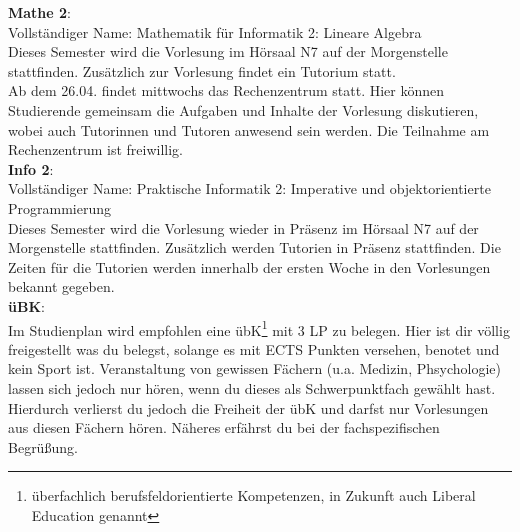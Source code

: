 \textbf{Mathe 2}:\\
Vollständiger Name: Mathematik für Informatik 2: Lineare Algebra\\
Dieses Semester wird die Vorlesung im Hörsaal N7 auf der Morgenstelle stattfinden.
Zusätzlich zur Vorlesung findet ein Tutorium statt. \\
Ab dem 26.04. findet mittwochs das Rechenzentrum statt. Hier können Studierende gemeinsam die Aufgaben und Inhalte der Vorlesung diskutieren,
wobei auch Tutorinnen und Tutoren anwesend sein werden. Die Teilnahme am Rechenzentrum ist freiwillig.\\

\textbf{Info 2}:\\
Vollständiger Name: Praktische Informatik 2: Imperative und objektorientierte Programmierung\\
Dieses Semester wird die Vorlesung wieder in Präsenz im Hörsaal N7 auf der Morgenstelle stattfinden.
Zusätzlich werden Tutorien in Präsenz stattfinden.
Die Zeiten für die Tutorien werden innerhalb der ersten Woche in den Vorlesungen bekannt gegeben.\\

\textbf{üBK}:\\
Im Studienplan wird empfohlen eine übK\footnote{überfachlich berufsfeldorientierte Kompetenzen, in Zukunft auch Liberal Education genannt}
mit 3 LP zu belegen. Hier ist dir völlig freigestellt was du belegst, solange es mit ECTS Punkten versehen, benotet und kein Sport ist.
Veranstaltung von gewissen Fächern (u.a. Medizin, Phsychologie) lassen sich jedoch nur hören, wenn du dieses als Schwerpunktfach gewählt hast.
Hierdurch verlierst du jedoch die Freiheit der übK und darfst nur Vorlesungen aus diesen Fächern hören. Näheres erfährst du bei der fachspezifischen Begrüßung.

